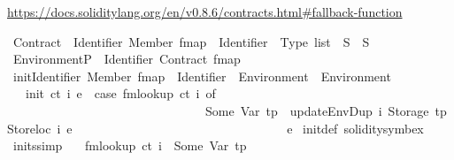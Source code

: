 \begin{isabellebody}
\begin{isamarkuptext}
\begin{itemize}
\url{https://docs.soliditylang.org/en/v0.8.6/contracts.html#fallback-function}%
\end{itemize}%
\end{isamarkuptext}\isamarkuptrue%
\isamarkupfalse%
\ Contract\ {\isacharequal}{\kern0pt}\ {\isachardoublequoteopen}{\isacharparenleft}{\kern0pt}Identifier{\isacharcomma}{\kern0pt}\ Member{\isacharparenright}{\kern0pt}\ fmap\ {\isasymtimes}\ {\isacharparenleft}{\kern0pt}{\isacharparenleft}{\kern0pt}Identifier\ {\isasymtimes}\ Type{\isacharparenright}{\kern0pt}\ list\ {\isasymtimes}\ S{\isacharparenright}{\kern0pt}\ {\isasymtimes}\ S{\isachardoublequoteclose}\isanewline
\isanewline
{}\isamarkupfalse%
\ Environment\isactrlsub P\ {\isacharequal}{\kern0pt}\ {\isachardoublequoteopen}{\isacharparenleft}{\kern0pt}Identifier{\isacharcomma}{\kern0pt}\ Contract{\isacharparenright}{\kern0pt}\ fmap{\isachardoublequoteclose}\isanewline
\isanewline
{}\isamarkupfalse%
\ init{\isacharcolon}{\kern0pt}{\isacharcolon}{\kern0pt}{\isachardoublequoteopen}{\isacharparenleft}{\kern0pt}Identifier{\isacharcomma}{\kern0pt}\ Member{\isacharparenright}{\kern0pt}\ fmap\ {\isasymRightarrow}\ Identifier\ {\isasymRightarrow}\ Environment\ {\isasymRightarrow}\ Environment{\isachardoublequoteclose}\isanewline
\ \ \ {\isachardoublequoteopen}init\ ct\ i\ e\ {\isacharequal}{\kern0pt}\ {\isacharparenleft}{\kern0pt}case\ fmlookup\ ct\ i\ of\isanewline
\ \ \ \ \ \ \ \ \ \ \ \ \ \ \ \ \ \ \ \ \ \ \ \ \ \ \ \ \ \ \ \ Some\ {\isacharparenleft}{\kern0pt}Var\ tp{\isacharparenright}{\kern0pt}\ {\isasymRightarrow}\ updateEnvDup\ i\ {\isacharparenleft}{\kern0pt}Storage\ tp{\isacharparenright}{\kern0pt}\ {\isacharparenleft}{\kern0pt}Storeloc\ i{\isacharparenright}{\kern0pt}\ e\isanewline
\ \ \ \ \ \ \ \ \ \ \ \ \ \ \ \ \ \ \ \ \ \ \ \ \ \ \ \ \ \ \ {\isacharbar}{\kern0pt}\ {\isacharunderscore}{\kern0pt}\ {\isasymRightarrow}\ e{\isacharparenright}{\kern0pt}{\isachardoublequoteclose}\isanewline
\isanewline
{}\isamarkupfalse%
\ init{\isacharunderscore}{\kern0pt}def\ {\isacharbrackleft}{\kern0pt}solidity{\isacharunderscore}{\kern0pt}symbex{\isacharbrackright}{\kern0pt}\isanewline
\isanewline
{}\isamarkupfalse%
\ init{\isacharunderscore}{\kern0pt}s{}{}{\isacharbrackleft}{\kern0pt}simp{\isacharbrackright}{\kern0pt}{\isacharcolon}{\kern0pt}\isanewline
\ \ \ {\isachardoublequoteopen}fmlookup\ ct\ i\ {\isacharequal}{\kern0pt}\ Some\ {\isacharparenleft}{\kern0pt}Var\ tp{\isacharparenright}{\kern0pt}{\isachardoublequoteclose}\isanewline

\end{isabellebody}

